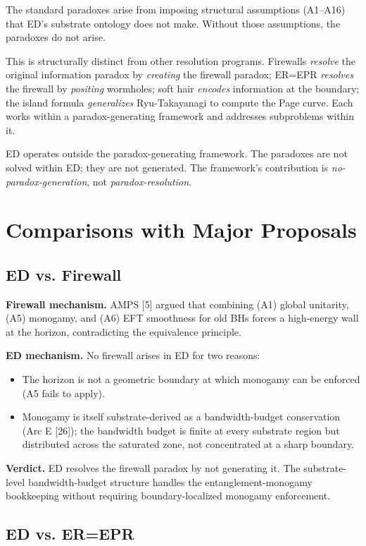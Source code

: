 \documentclass[11pt,a4paper]{article}
\begin{document}
The standard paradoxes arise from imposing structural assumptions (A1--A16) that ED's substrate ontology does not make. Without those assumptions, the paradoxes do not arise.

This is structurally distinct from other resolution programs. Firewalls \emph{resolve} the original information paradox by \emph{creating} the firewall paradox; ER=EPR \emph{resolves} the firewall by \emph{positing} wormholes; soft hair \emph{encodes} information at the boundary; the island formula \emph{generalizes} Ryu-Takayanagi to compute the Page curve. Each works within a paradox-generating framework and addresses subproblems within it.

ED operates outside the paradox-generating framework. The paradoxes are not solved within ED; they are not generated. The framework's contribution is \emph{no-paradox-generation}, not \emph{paradox-resolution}.

\section{Comparisons with Major Proposals}

\subsection{ED vs. Firewall}

\textbf{Firewall mechanism.} AMPS [5] argued that combining (A1) global unitarity, (A5) monogamy, and (A6) EFT smoothness for old BHs forces a high-energy wall at the horizon, contradicting the equivalence principle.

\textbf{ED mechanism.} No firewall arises in ED for two reasons:
\begin{itemize}[noitemsep]
  \item The horizon is not a geometric boundary at which monogamy can be enforced (A5 fails to apply).
  \item Monogamy is itself substrate-derived as a bandwidth-budget conservation (Arc E [26]); the bandwidth budget is finite at every substrate region but distributed across the saturated zone, not concentrated at a sharp boundary.
\end{itemize}

\textbf{Verdict.} ED resolves the firewall paradox by not generating it. The substrate-level bandwidth-budget structure handles the entanglement-monogamy bookkeeping without requiring boundary-localized monogamy enforcement.

\subsection{ED vs. ER=EPR}
\end{document}
